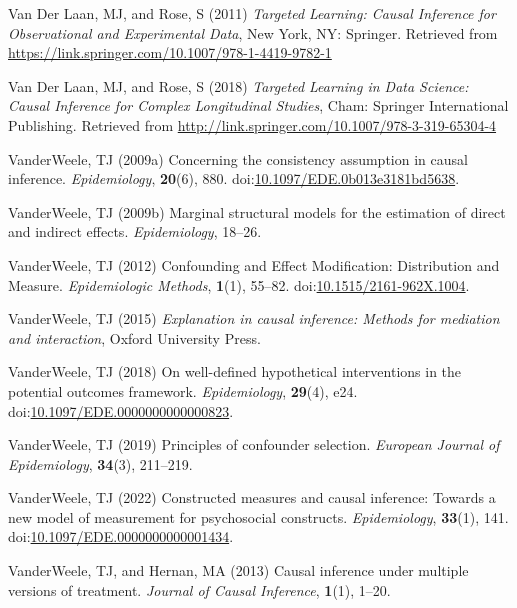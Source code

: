 \documentclass[
  single column]{article}
\newlength{\cslhangindent}
\newenvironment{CSLReferences}[2] %
 {\begin{list}{}{%
  \setlength{\itemindent}{0pt}
  \setlength{\leftmargin}{0pt}
  \setlength{\parsep}{0pt}
  \ifodd #1
   \setlength{\leftmargin}{\cslhangindent}
   \setlength{\itemindent}{-1\cslhangindent}
  \fi
  \setlength{\itemsep}{#2\baselineskip}}}
 {\end{list}}
\begin{document}
\begin{CSLReferences}{1}{0}
Van Der Laan, MJ, and Rose, S (2011) \emph{Targeted Learning: Causal
Inference for Observational and Experimental Data}, New York, NY:
Springer. Retrieved from
\url{https://link.springer.com/10.1007/978-1-4419-9782-1}

Van Der Laan, MJ, and Rose, S (2018) \emph{Targeted Learning in Data
Science: Causal Inference for Complex Longitudinal Studies}, Cham:
Springer International Publishing. Retrieved from
\url{http://link.springer.com/10.1007/978-3-319-65304-4}

VanderWeele, TJ (2009a) Concerning the consistency assumption in causal
inference. \emph{Epidemiology}, \textbf{20}(6), 880.
doi:\href{https://doi.org/10.1097/EDE.0b013e3181bd5638}{10.1097/EDE.0b013e3181bd5638}.

VanderWeele, TJ (2009b) Marginal structural models for the estimation of
direct and indirect effects. \emph{Epidemiology}, 18--26.

VanderWeele, TJ (2012) Confounding and Effect Modification: Distribution
and Measure. \emph{Epidemiologic Methods}, \textbf{1}(1), 55--82.
doi:\href{https://doi.org/10.1515/2161-962X.1004}{10.1515/2161-962X.1004}.

VanderWeele, TJ (2015) \emph{Explanation in causal inference: Methods
for mediation and interaction}, Oxford University Press.

VanderWeele, TJ (2018) On well-defined hypothetical interventions in the
potential outcomes framework. \emph{Epidemiology}, \textbf{29}(4), e24.
doi:\href{https://doi.org/10.1097/EDE.0000000000000823}{10.1097/EDE.0000000000000823}.

VanderWeele, TJ (2019) Principles of confounder selection.
\emph{European Journal of Epidemiology}, \textbf{34}(3), 211--219.

VanderWeele, TJ (2022) Constructed measures and causal inference:
Towards a new model of measurement for psychosocial constructs.
\emph{Epidemiology}, \textbf{33}(1), 141.
doi:\href{https://doi.org/10.1097/EDE.0000000000001434}{10.1097/EDE.0000000000001434}.

VanderWeele, TJ, and Hernan, MA (2013) Causal inference under multiple
versions of treatment. \emph{Journal of Causal Inference},
\textbf{1}(1), 1--20.


\end{CSLReferences}
\end{document}
